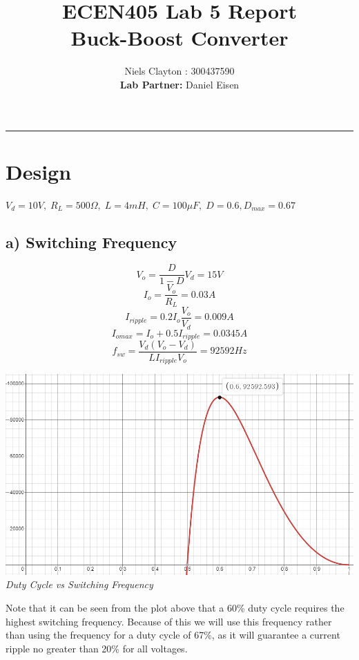 \documentclass[a4paper,11pt]{article}
\begin{document}
\begin{preview}
\title{\LARGE{\textbf{ECEN405 Lab 5 Report\\Buck-Boost Converter}}}
\author{Niels Clayton : 300437590\\\textbf{Lab Partner:} Daniel Eisen}
\date{}
\maketitle
\hrule

\section{Design}
    $V_d=10V,\; R_L=500\Omega,\; L=4mH,\; C=100\mu F,\; D=0.6, D_{max} = 0.67$
        \subsection*{a) Switching Frequency}
            $$V_{o}=\frac{D}{1-D}V_{d}=15V$$
            $$I_{o}=\frac{V_{o}}{R_{L}}=0.03A$$
            $$I_{ripple}=0.2I_{o}\frac{V_{o}}{V_{d}}=0.009A$$
            $$I_{omax}=I_{o}+0.5I_{ripple}=0.0345A$$
            $$f_{sw}=\frac{V_{d}\left(V_{o}-V_{d}\right)}{LI_{ripple}V_{o}} = 92592Hz$$
            \begin{center}
                \includegraphics[width=1\textwidth]{frequency.png}\\
                \textit{Duty Cycle vs Switching Frequency}
            \end{center}
            Note that it can be seen from the plot above that a 60\% duty cycle requires the highest switching frequency. Because of this we will use this frequency rather than using the frequency for a duty cycle of 67\%, as it will guarantee a current ripple no greater than 20\% for all voltages.\\


\end{preview}
\end{document}
